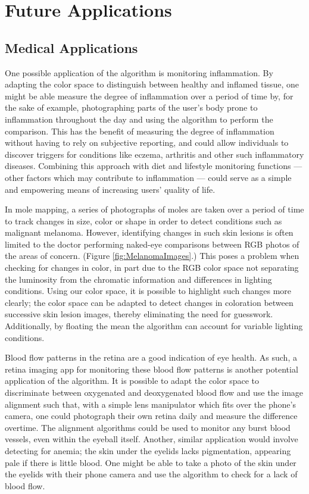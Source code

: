 \section{Future Applications}\label{sec:FutureApplications}


\subsection{Medical Applications}\label{sec:MedicalApplications}

One possible application of the algorithm is monitoring inflammation. By adapting the color space to distinguish between healthy and inflamed tissue, one might be able measure the degree of inflammation over a period of time by, for the sake of example, photographing parts of the user's body prone to inflammation throughout the day and using the algorithm to perform the comparison. This has the benefit of measuring the degree of inflammation without having to rely on subjective reporting, and could allow individuals to discover triggers for conditions like eczema, arthritis and other such inflammatory diseases. Combining this approach with diet and lifestyle monitoring functions --- other factors which may contribute to inflammation --- could serve as a simple and empowering means of increasing users' quality of life.

In mole mapping, a series of photographs of moles are taken over a period of time to track changes in size, color or shape in order to detect conditions such as malignant melanoma. However, identifying changes in such skin lesions is often limited to the doctor performing naked-eye comparisons between RGB photos of the areas of concern. (Figure \ref{fig:MelanomaImages}.) This poses a problem when checking for changes in color, in part due to the RGB color space not separating the luminosity from the chromatic information and differences in lighting conditions. Using our color space, it is possible to highlight such changes more clearly; the color space can be adapted to detect changes in coloration between successive skin lesion images, thereby eliminating the need for guesswork. Additionally, by floating the mean the algorithm can account for variable lighting conditions.

Blood flow patterns in the retina are a good indication of eye health. As such, a retina imaging app for monitoring these blood flow patterns is another potential application of the algorithm. It is possible to adapt the color space to discriminate between oxygenated and deoxygenated blood flow and use the image alignment such that, with a simple lens manipulator which fits over the phone's camera, one could photograph their own retina daily and measure the difference overtime. The alignment algorithms could be used to monitor any burst blood vessels, even within the eyeball itself. Another, similar application would involve detecting for anemia; the skin under the eyelids lacks pigmentation, appearing pale if there is little blood. One might be able to take a photo of the skin under the eyelids with their phone camera and use the algorithm to check for a lack of blood flow.

